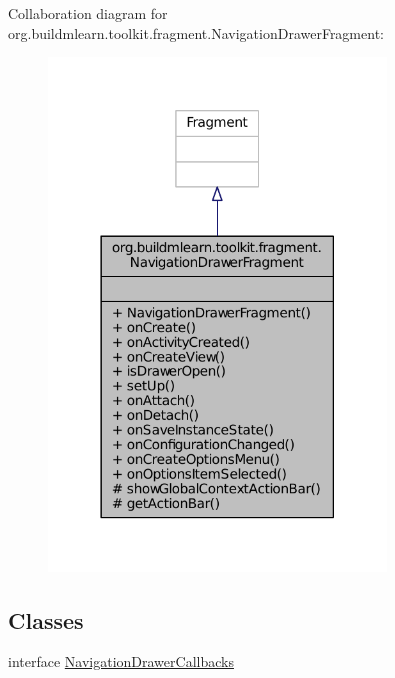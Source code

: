 Collaboration diagram for org.\-buildmlearn.\-toolkit.\-fragment.\-Navigation\-Drawer\-Fragment\-:
\nopagebreak
\begin{figure}[H]
\begin{center}
\leavevmode
\includegraphics[width=254pt]{d3/d5d/classorg_1_1buildmlearn_1_1toolkit_1_1fragment_1_1NavigationDrawerFragment__coll__graph}
\end{center}
\end{figure}
\subsection*{Classes}
\begin{DoxyCompactItemize}
\item 
interface \hyperlink{interfaceorg_1_1buildmlearn_1_1toolkit_1_1fragment_1_1NavigationDrawerFragment_1_1NavigationDrawerCallbacks}{Navigation\-Drawer\-Callbacks}
\end{DoxyCompactItemize}
